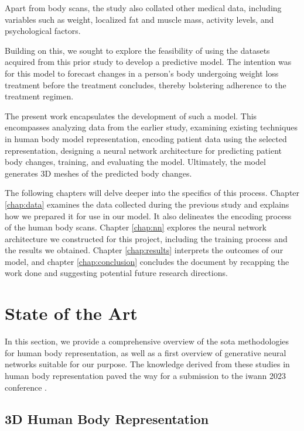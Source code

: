 Apart from body scans, the study also collated other medical data, including
variables such as weight, localized fat and muscle mass, activity levels, and
psychological factors.

Building on this, we sought to explore the feasibility of using the datasets
acquired from this prior study to develop a predictive model. The intention was
for this model to forecast changes in a person's body undergoing weight loss
treatment before the treatment concludes, thereby bolstering adherence to the
treatment regimen.

The present work encapsulates the development of such a model. This encompasses
analyzing data from the earlier study, examining existing techniques in human
body model representation, encoding patient data using the selected
representation, designing a neural network architecture for predicting patient
body changes, training, and evaluating the model. Ultimately, the model
generates 3D meshes of the predicted body changes.

The following chapters will delve deeper into the specifics of this process.
Chapter \ref{chap:data} examines the data collected during the previous study
and explains how we prepared it for use in our model. It also delineates the
encoding process of the human body scans. Chapter \ref{chap:nn} explores the
neural network architecture we constructed for this project, including the
training process and the results we obtained. Chapter \ref{chap:results}
interprets the outcomes of our model, and chapter \ref{chap:conclusion}
concludes the document by recapping the work done and suggesting potential
future research directions.

\section{State of the Art}\label{sec:sota}

In this section, we provide a comprehensive overview of the \gls{sota}
methodologies for human body representation, as well as a first overview of
generative neural networks suitable for our purpose. The knowledge derived from
these studies in human body representation paved the way for a submission to
the \gls{iwann} 2023 conference \citep{review:2023}.

\subsection{3D Human Body Representation}


